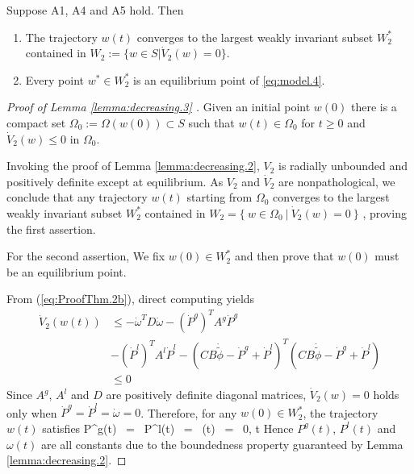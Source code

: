 \begin{lemma}
        		\label{lemma:decreasing.3}
        		Suppose A1, A4 and A5 hold. Then 
        		\begin{enumerate}
        			\item The trajectory $w(t)$  converges to the largest weakly invariant subset $W_2^*$ contained in $W_2:=\{w\in S | \dot V_2(w)=0 \}$.
        			\item Every point $w^*\in W_2^*$ is an equilibrium point of \eqref{eq:model.4}.
        		\end{enumerate}  	
        	\end{lemma}
        
        \begin{proof} [Proof of Lemma \ref{lemma:decreasing.3} ] 
        	Given an initial point $w(0)$ there is a compact set $\Omega_0 := \Omega(w(0)) \subset S$ such that $w(t)\in\Omega_0$ 
        	for $t\geq 0$ and $\dot V_2(w) \leq 0$ in $\Omega_0$. 
        	
        	Invoking the proof of Lemma \ref{lemma:decreasing.2}, $V_2$ is radially unbounded and positively definite except at equilibrium. As $V_2$ and $\dot{V}_2$ are nonpathological,   we conclude that any trajectory $w(t)$ starting from $\Omega_0$ converges to the largest weakly invariant subset $W_2^*$ contained in $W_2=\{\ w\in \Omega_0\ |\ \dot V_2(w) =0\ \}$ \cite[Proposition 3]{Bacciotti:Nonpathological}, proving  the first assertion.
        	
        For the second assertion, We fix $w(0) \in W_2^*$ and then prove that $w(0)$ must be an equilibrium point. 
        		
       	From (\ref{eq:ProofThm.2b}), direct computing yields 
        	\begin{align}
        	\dot V_{2}(w(t)) &\le  -\dot{\omega}^TD \dot {\omega}-(\dot {P}^g)^T A^g \dot {P}^g \nonumber\\
        	&-(\dot {P}^l)^T A^l \dot {P}^l -(CB\dot{\tilde \phi}-\dot {P}^g+\dot {P}^l)^T(CB\dot{\tilde \phi}-\dot {P}^g+\dot {P}^l)\nonumber\\
        	&\le 0
        	\label{dot V2}
        	\end{align}
       Since $A^g$, $A^l$ and $D$ are positively definite diagonal matrices, $\dot{V}_2(w)=0$ holds  only when $ \dot P^g = \dot P^l = \dot \omega=0$. Therefore, for any $w(0)  \in W_2^*$, the trajectory $w(t)$ satisfies 
       \bq
       \label{eq:dotV=0}
       \dot P^g(t) \ = \ \dot P^l(t) \ = \ \dot \omega(t) \ = \ 0, \qquad t
       \eq
Hence $P^g(t)$, $P^l(t)$ and $\omega(t)$ are all constants due to the boundedness property guaranteed by  Lemma \ref{lemma:decreasing.2}.


\end{proof}
